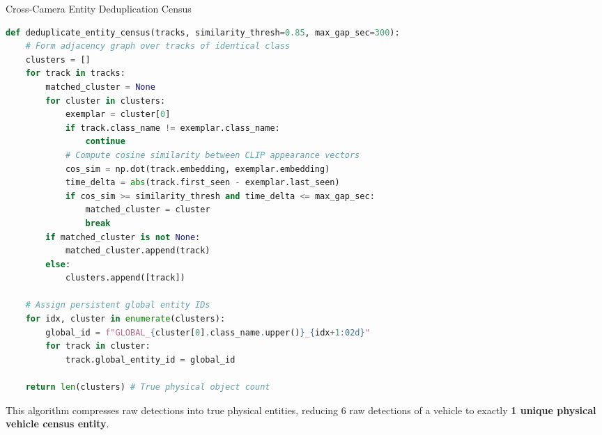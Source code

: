 \documentclass[12pt,a4paper]{article}
\begin{document}
\begin{algorithm}
\caption{Cross-Camera Entity Deduplication Census}
\begin{lstlisting}[language=Python]
def deduplicate_entity_census(tracks, similarity_thresh=0.85, max_gap_sec=300):
    # Form adjacency graph over tracks of identical class
    clusters = []
    for track in tracks:
        matched_cluster = None
        for cluster in clusters:
            exemplar = cluster[0]
            if track.class_name != exemplar.class_name:
                continue
            # Compute cosine similarity between CLIP appearance vectors
            cos_sim = np.dot(track.embedding, exemplar.embedding)
            time_delta = abs(track.first_seen - exemplar.last_seen)
            if cos_sim >= similarity_thresh and time_delta <= max_gap_sec:
                matched_cluster = cluster
                break
        if matched_cluster is not None:
            matched_cluster.append(track)
        else:
            clusters.append([track])
            
    # Assign persistent global entity IDs
    for idx, cluster in enumerate(clusters):
        global_id = f"GLOBAL_{cluster[0].class_name.upper()}_{idx+1:02d}"
        for track in cluster:
            track.global_entity_id = global_id
            
    return len(clusters) # True physical object count
\end{lstlisting}
\end{algorithm}

This algorithm compresses raw detections into true physical entities, reducing 6 raw detections of a vehicle to exactly \textbf{1 unique physical vehicle census entity}.
\end{document}
